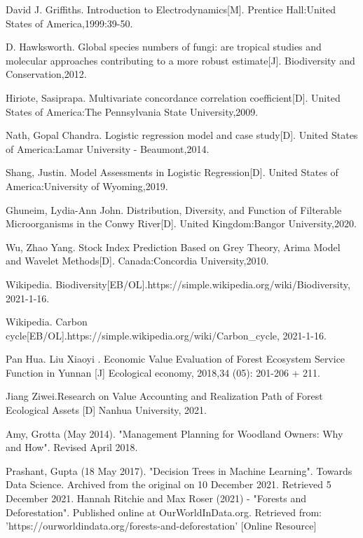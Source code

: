 \begin{thebibliography}{99}
 David J. Griffiths. Introduction to Electrodynamics[M]. Prentice Hall:United States of America,1999:39-50.
  
 D. Hawksworth. Global species numbers of fungi: are tropical studies and molecular approaches contributing to a more robust estimate[J]. Biodiversity and Conservation,2012.
  
 Hiriote, Sasiprapa. Multivariate concordance correlation coefficient[D]. United States of America:The Pennsylvania State University,2009.
  
 Nath, Gopal Chandra. Logistic regression model and case study[D]. United States of America:Lamar University - Beaumont,2014.
  
 Shang, Justin. Model Assessments in Logistic Regression[D]. United States of America:University of Wyoming,2019.
  
 Ghuneim, Lydia-Ann John. Distribution, Diversity, and Function of Filterable Microorganisms in the Conwy River[D]. United Kingdom:Bangor University,2020.
  
 Wu, Zhao Yang. Stock Index Prediction Based on Grey Theory, Arima Model and Wavelet Methods[D]. Canada:Concordia University,2010.
  
 Wikipedia. Biodiversity[EB/OL].https://simple.wikipedia.org/wiki/Biodiversity, 2021-1-16.
  
 Wikipedia. Carbon cycle[EB/OL].https://simple.wikipedia.org/wiki/Carbon\_cycle, 2021-1-16.
 
 Pan Hua. Liu Xiaoyi . Economic Value Evaluation of Forest Ecosystem Service Function in Yunnan [J] Ecological economy, 2018,34 (05): 201-206 + 211.
 
 Jiang Ziwei.Research on Value Accounting and Realization Path of Forest Ecological Assets [D] Nanhua University, 2021.
 
  Amy, Grotta (May 2014). "Management Planning for Woodland Owners: Why and How". Revised April 2018.
  
  Prashant, Gupta (18 May 2017). "Decision Trees in Machine Learning". Towards Data Science. Archived from the original on 10 December 2021. Retrieved 5 December 2021.
 Hannah Ritchie and Max Roser (2021) - "Forests and Deforestation". Published online at OurWorldInData.org. Retrieved from: 'https://ourworldindata.org/forests-and-deforestation' [Online Resource]
 
\end{thebibliography}